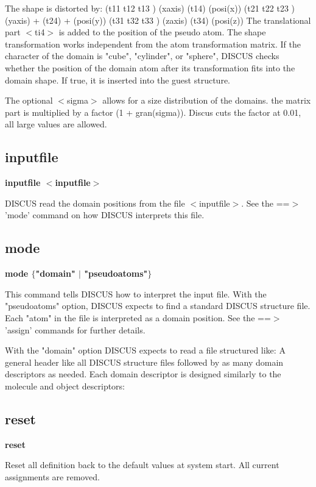 The shape is distorted by: 
(t11  t12  t13 ) (xaxis)   (t14)   (posi(x)) 
(t21  t22  t23 ) (yaxis) + (t24) + (posi(y)) 
(t31  t32  t33 ) (zaxis)   (t34)   (posi(z)) 
The translational part $ <$ti4$> $ is added to the position of the 
pseudo atom. The shape transformation works independent from the atom 
transformation matrix. 
If the character of the domain is "cube", "cylinder", or "sphere", 
DISCUS checks whether the position of the domain atom after its 
transformation fits into the domain shape. If true, it is inserted into 
the guest structure. 
\par
The optional $ <$sigma$> $ allows for a size distribution of the domains. 
the matrix part is multiplied by a factor (1 + gran(sigma)). 
Discus cuts the factor at 0.01, all large values are allowed. 
\subsection*{inputfile}
{\bf inputfile $ <$inputfile$> $ \par }
\par
\vspace{3pt}
DISCUS read the domain positions from the file $ <$inputfile$> $. See the 
==$> $ 'mode' command on how DISCUS interprets this file. 
\subsection*{mode}
{\bf mode $ \{$"domain" $| $ "pseudoatoms"$\} $ \par }
\par
\vspace{3pt}
This command tells DISCUS how to interpret the input file. 
With the "pseudoatoms" option, DISCUS expects to find a standard 
DISCUS structure file. Each "atom" in the file is interpreted as 
a domain position. See the ==$> $ 'assign' commands for further details. 
\par
With the "domain" option DISCUS expects to read a file structured 
like: 
A general header like all DISCUS structure files followed by as many 
domain descriptors as needed. Each domain descriptor is designed 
similarly to the molecule and object descriptors: 
\subsection*{reset}
{\bf reset \par }
\par
\vspace{3pt}
Reset all definition back to the default values at system start. 
All current assignments are removed. 
